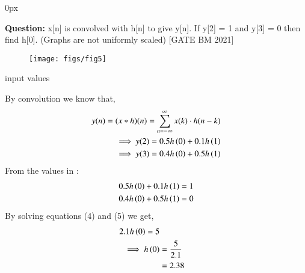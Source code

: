 \documentclass[journal,12pt,onecolumn]{IEEEtran}
\begin{document}
	\parindent 0px
	
	
	
	
	\title{}
	\author{EE23BTECH11209 - K S Ballvardhan$^{*}$
	}
	\maketitle
	\bigskip
	
	
	
	
	
	\textbf{Question:} x[n] is convolved with h[n] to give y[n]. If y[2] = 1 and y[3] = 0 then find h[0]. (Graphs are not uniformly scaled) \hfill[GATE BM 2021]
	\begin{figure}[ht]
		\texttt{[image: figs/fig5]}
		\centering
		\label{fig: fig5}
	\end{figure}
	
	\solution
	
	\begin{table}[ht] 
		\centering
		
		\caption{input values}
		\label{tab: Table2021bm30}
	\end{table}
	By convolution we know that,
	\begin{align}
		y(n) = (x*h)(n) = \sum_{n=-\infty}^{\infty} x(k) \cdot h(n-k) \\
	\implies y(2) = 0.5h \left(0\right) + 0.1h \left(1\right) \\
	\implies y(3) = 0.4h \left(0\right) + 0.5h \left(1\right) 
	\end{align}
	From the values in :
	\begin{align}
		0.5h \left(0\right) + 0.1h \left(1\right) &= 1 \\
		0.4h \left(0\right) + 0.5h \left(1\right) &= 0
	\end{align}
	By solving equations (4) and (5) we get,
	\begin{align}
		2.1h \left(0\right) = 5  \\
	\implies h \left(0\right) &= \frac {5}{2.1} \\
	                   &= 2.38
	\end{align}
\end{document}
